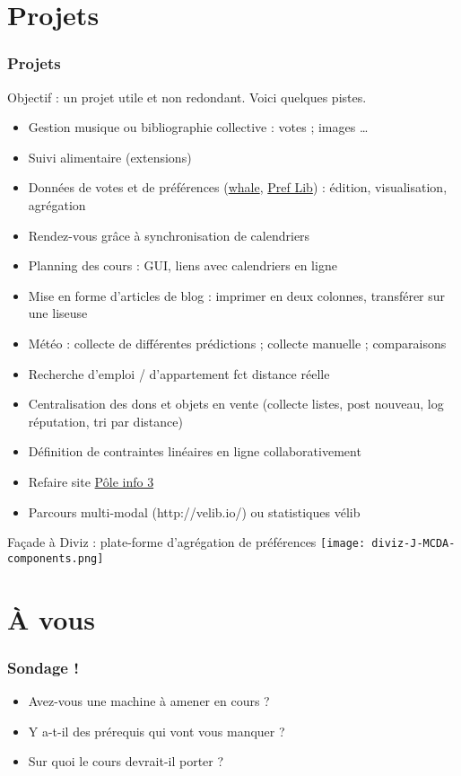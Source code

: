 \documentclass[english, french]{beamer}
\begin{document}
\section{Projets}
\begin{frame}[allowframebreaks]
	\frametitle{Projets}
	Objectif : un projet utile et non redondant. Voici quelques pistes.
	\begin{itemize}
		\item Gestion musique ou bibliographie collective : votes ; images …
		\item Suivi alimentaire (extensions)
		\item Données de votes et de préférences ({\href{http://whale3.noiraudes.net/whale3/index.do}{whale}, \href{http://www.preflib.org/}{Pref Lib}}) : édition, visualisation, agrégation
		\item Rendez-vous grâce à synchronisation de calendriers
		\item Planning des cours : GUI, liens avec calendriers en ligne
		\item Mise en forme d’articles de blog : imprimer en deux colonnes, transférer sur une liseuse
		\item Météo : collecte de différentes prédictions ; collecte manuelle ; comparaisons
		\item Recherche d’emploi / d’appartement fct distance réelle
		\item Centralisation des dons et objets en vente (collecte listes, post nouveau, log réputation, tri par distance)
		\item Définition de contraintes linéaires en ligne collaborativement
		\item Refaire site \href{http://www.poleinfo3.dauphine.fr/}{Pôle info 3}
		\item Parcours multi-modal (http://velib.io/) ou statistiques vélib
	\end{itemize}
	Façade à Diviz : plate-forme d’agrégation de préférences
	\texttt{[image: diviz-J-MCDA-components.png]}
\end{frame}

\section{À vous}
\begin{frame}
	\frametitle{Sondage !}
	\begin{itemize}
		\item Avez-vous une machine à amener en cours ?
		\item Y a-t-il des prérequis qui vont vous manquer ?
		\item Sur quoi le cours devrait-il porter ?
	\end{itemize}
\end{frame}
\end{document}
